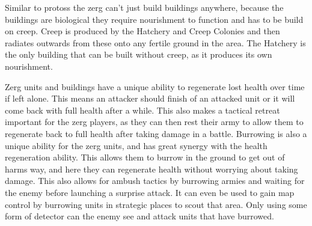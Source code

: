  Similar to protoss the zerg can't just build buildings anywhere, because the buildings are biological they require nourishment to function and has to be build on creep. Creep is produced by the Hatchery and Creep Colonies and then radiates outwards from these onto any fertile ground in the area. The Hatchery is the only building that can be built without creep, as it produces its own nourishment. 

 Zerg units and buildings have a unique ability to regenerate lost health over time if left alone. This means an attacker should finish of an attacked unit or it will come back with full health after a while. This also makes a tactical retreat important for the zerg players, as they can then rest their army to allow them to regenerate back to full health after taking damage in a battle. Burrowing is also a unique ability for the zerg units, and has great synergy with the health regeneration ability. This allows them to burrow in the ground to get out of harms way, and here they can regenerate health without worrying about taking damage. This also allows for ambush tactics by burrowing armies and waiting for the enemy before launching a surprise attack. It can even be used to gain map control by burrowing units in strategic places to scout that area. Only using some form of detector can the enemy see and attack units that have burrowed. 
